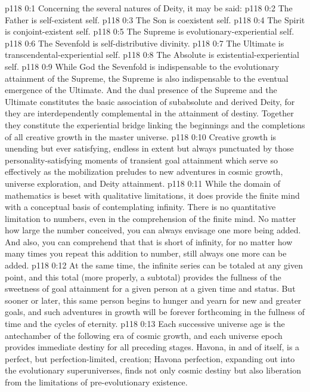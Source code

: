 \author{Mighty Messenger}
\vs p118 0:1 Concerning the several natures of Deity, it may be said:
\pc \vs p118 0:2 \bibnobreakspace The Father is self\hyp{}existent self.
\vs p118 0:3 \bibnobreakspace The Son is coexistent self.
\vs p118 0:4 \bibnobreakspace The Spirit is conjoint\hyp{}existent self.
\vs p118 0:5 \bibnobreakspace The Supreme is evolutionary\hyp{}experiential self.
\vs p118 0:6 \bibnobreakspace The Sevenfold is self\hyp{}distributive divinity.
\vs p118 0:7 \bibnobreakspace The Ultimate is transcendental\hyp{}experiential self.
\vs p118 0:8 \bibnobreakspace The Absolute is existential\hyp{}experiential self.
\pc \vs p118 0:9 While God the Sevenfold is indispensable to the evolutionary attainment of the Supreme, the Supreme is also indispensable to the eventual emergence of the Ultimate. And the dual presence of the Supreme and the Ultimate constitutes the basic association of subabsolute and derived Deity, for they are interdependently complemental in the attainment of destiny. Together they constitute the experiential bridge linking the beginnings and the completions of all creative growth in the master universe.
\pc \vs p118 0:10 Creative growth is unending but ever satisfying, endless in extent but always punctuated by those personality\hyp{}satisfying moments of transient goal attainment which serve so effectively as the mobilization preludes to new adventures in cosmic growth, universe exploration, and Deity attainment.
\vs p118 0:11 While the domain of mathematics is beset with qualitative limitations, it does provide the finite mind with a conceptual basis of contemplating infinity. There is no quantitative limitation to numbers, even in the comprehension of the finite mind. No matter how large the number conceived, you can always envisage one more being added. And also, you can comprehend that that is short of infinity, for no matter how many times you repeat this addition to number, still always one more can be added.\plusone
\vs p118 0:12 At the same time, the infinite series can be totaled at any given point, and this total (more properly, a subtotal) provides the fullness of the sweetness of goal attainment for a given person at a given time and status. But sooner or later, this same person begins to hunger and yearn for new and greater goals, and such adventures in growth will be forever forthcoming in the fullness of time and the cycles of eternity.
\vs p118 0:13 Each successive universe age is the antechamber of the following era of cosmic growth, and each universe epoch provides immediate destiny for all preceding stages. Havona, in and of itself, is a perfect, but perfection\hyp{}limited, creation; Havona perfection, expanding out into the evolutionary superuniverses, finds not only cosmic destiny but also liberation from the limitations of pre\hyp{}evolutionary existence.
